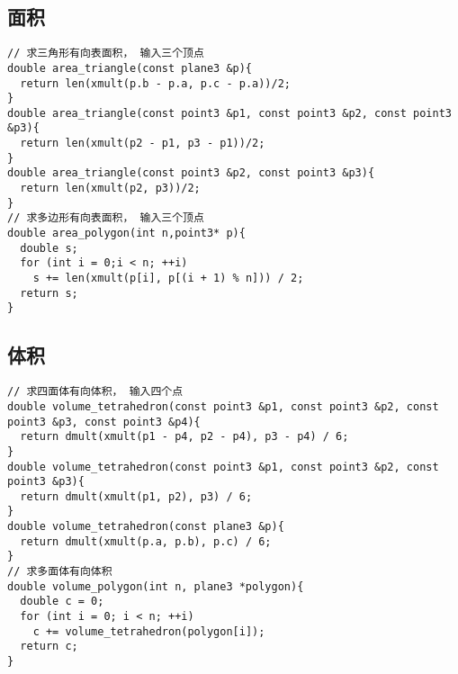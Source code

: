 \subsection{面积}
\begin{lstlisting}[language={}]
// 求三角形有向表面积， 输入三个顶点
double area_triangle(const plane3 &p){
  return len(xmult(p.b - p.a, p.c - p.a))/2;
} 
double area_triangle(const point3 &p1, const point3 &p2, const point3 &p3){
  return len(xmult(p2 - p1, p3 - p1))/2;
} 
double area_triangle(const point3 &p2, const point3 &p3){
  return len(xmult(p2, p3))/2;
} 
// 求多边形有向表面积， 输入三个顶点
double area_polygon(int n,point3* p){
  double s;
  for (int i = 0;i < n; ++i)
    s += len(xmult(p[i], p[(i + 1) % n])) / 2;
  return s;
}
\end{lstlisting}
\subsection{体积}
\begin{lstlisting}[language={}]
// 求四面体有向体积， 输入四个点
double volume_tetrahedron(const point3 &p1, const point3 &p2, const point3 &p3, const point3 &p4){
  return dmult(xmult(p1 - p4, p2 - p4), p3 - p4) / 6;
}
double volume_tetrahedron(const point3 &p1, const point3 &p2, const point3 &p3){
  return dmult(xmult(p1, p2), p3) / 6;
}
double volume_tetrahedron(const plane3 &p){
  return dmult(xmult(p.a, p.b), p.c) / 6;
}
// 求多面体有向体积 
double volume_polygon(int n, plane3 *polygon){
  double c = 0;
  for (int i = 0; i < n; ++i)
    c += volume_tetrahedron(polygon[i]);
  return c;
}
\end{lstlisting}
